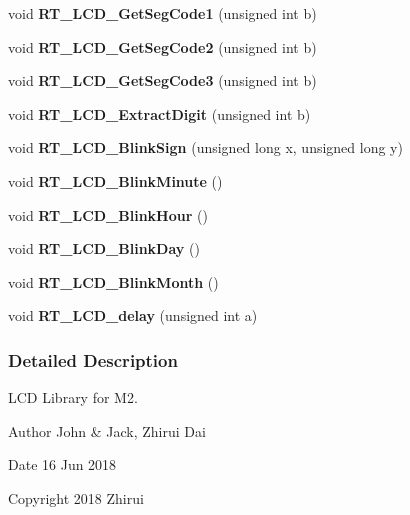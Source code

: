 \begin{DoxyCompactItemize}
\item 
\mbox{\label{a00017_aae2c1b552983feebd72e5f739a30a7cd}} 
void {\bfseries R\+T\+\_\+\+L\+C\+D\+\_\+\+Get\+Seg\+Code1} (unsigned int b)
\item 
\mbox{\label{a00017_a5e703bca85c9cc0dc9c7993c6c314431}} 
void {\bfseries R\+T\+\_\+\+L\+C\+D\+\_\+\+Get\+Seg\+Code2} (unsigned int b)
\item 
\mbox{\label{a00017_ab9985e2069b2f8844ca1e80f9969e96b}} 
void {\bfseries R\+T\+\_\+\+L\+C\+D\+\_\+\+Get\+Seg\+Code3} (unsigned int b)
\item 
\mbox{\label{a00017_ad5869afef2424a580fb806bd55683c8c}} 
void {\bfseries R\+T\+\_\+\+L\+C\+D\+\_\+\+Extract\+Digit} (unsigned int b)
\item 
\mbox{\label{a00017_a0acb96d42649bb3d6456cfe07748c5e3}} 
void {\bfseries R\+T\+\_\+\+L\+C\+D\+\_\+\+Blink\+Sign} (unsigned long x, unsigned long y)
\item 
\mbox{\label{a00017_add81e1c5934c086f496757d4b94eae40}} 
void {\bfseries R\+T\+\_\+\+L\+C\+D\+\_\+\+Blink\+Minute} ()
\item 
\mbox{\label{a00017_a50aa87e25123f237635239d5c3f89950}} 
void {\bfseries R\+T\+\_\+\+L\+C\+D\+\_\+\+Blink\+Hour} ()
\item 
\mbox{\label{a00017_a2146a6f0be7b108193ed83a0b1e28fa5}} 
void {\bfseries R\+T\+\_\+\+L\+C\+D\+\_\+\+Blink\+Day} ()
\item 
\mbox{\label{a00017_afef9a5b98aca184fab9a6e42a874fcba}} 
void {\bfseries R\+T\+\_\+\+L\+C\+D\+\_\+\+Blink\+Month} ()
\item 
\mbox{\label{a00017_a29fd052c1a030571b2afb76946da9108}} 
void {\bfseries R\+T\+\_\+\+L\+C\+D\+\_\+delay} (unsigned int a)
\end{DoxyCompactItemize}


\subsubsection{Detailed Description}
L\+CD Library for M2. 

\begin{DoxyAuthor}{Author}
John \& Jack, Zhirui Dai 
\end{DoxyAuthor}
\begin{DoxyDate}{Date}
16 Jun 2018 
\end{DoxyDate}
\begin{DoxyCopyright}{Copyright}
2018 Zhirui 
\end{DoxyCopyright}
